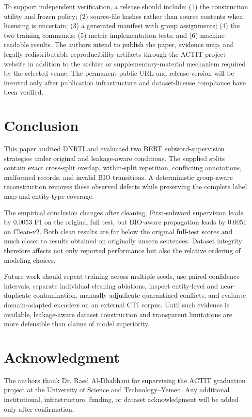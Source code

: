 \documentclass[conference]{IEEEtran}
\begin{document}
To support independent verification, a release should include: (1) the construction utility and frozen policy; (2) source-file hashes rather than source contents when licensing is uncertain; (3) a generated manifest with group assignments; (4) the two training commands; (5) metric implementation tests; and (6) machine-readable results. The authors intend to publish the paper, evidence map, and legally redistributable reproducibility artifacts through the ACTIT project website in addition to the archive or supplementary-material mechanism required by the selected venue. The permanent public URL and release version will be inserted only after publication infrastructure and dataset-license compliance have been verified.

\section{Conclusion}
This paper audited DNRTI and evaluated two BERT subword-supervision strategies under original and leakage-aware conditions. The supplied splits contain exact cross-split overlap, within-split repetition, conflicting annotations, malformed records, and invalid BIO transitions. A deterministic group-aware reconstruction removes these observed defects while preserving the complete label map and entity-type coverage.

The empirical conclusion changes after cleaning. First-subword supervision leads by 0.0053 F1 on the original full test, but BIO-aware propagation leads by 0.0051 on Clean-v2. Both clean results are far below the original full-test scores and much closer to results obtained on originally unseen sentences. Dataset integrity therefore affects not only reported performance but also the relative ordering of modeling choices.

Future work should repeat training across multiple seeds, use paired confidence intervals, separate individual cleaning ablations, inspect entity-level and near-duplicate contamination, manually adjudicate quarantined conflicts, and evaluate domain-adapted encoders on an external CTI corpus. Until such evidence is available, leakage-aware dataset construction and transparent limitations are more defensible than claims of model superiority.

\section*{Acknowledgment}
The authors thank Dr. Raed Al-Dhabhani for supervising the ACTIT graduation project at the University of Science and Technology--Yemen. Any additional institutional, infrastructure, funding, or dataset acknowledgment will be added only after confirmation.



\end{document}
